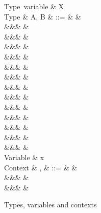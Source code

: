\begin{figure}[H]
\begin{syntaxfig}
\mbox{Type variable}
&
X
\\[2mm]
\mbox{Type}
&
A, B
&
::=
&
&
\\
&&&
&
\\
&&&
\tyUnit
&
\\
&&&
&
\\
&&&
&
\\
&&&
&
\\
&&&
&
\\
&&&
&
\\
&&&
&
\\
&&&
&
\\
&&&
&
\\
&&&
&
\\
&&&
&
\\
&&&
&
\\[2mm]
\mbox{Variable}
&
x
\\[2mm]
\mbox{Context}
&
\Gamma, \Delta
&
::=
&
\cxtEmpty
&
\\
&&&
&
\\
&&&
&
\\[2mm]
\end{syntaxfig}
\caption{Types, variables and contexts}
\end{figure}
